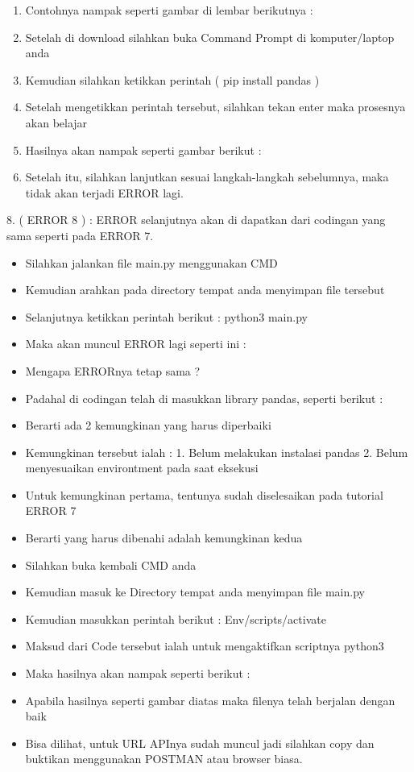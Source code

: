 \begin{itemize}
\begin{enumerate}
\item Contohnya nampak seperti gambar di lembar berikutnya : 
\item Setelah di download silahkan buka Command Prompt di komputer/laptop anda 
\item Kemudian silahkan ketikkan perintah ( pip install pandas ) 
\item Setelah mengetikkan perintah tersebut, silahkan tekan enter maka prosesnya akan belajar 
\item Hasilnya akan nampak seperti gambar berikut : 
\item Setelah itu, silahkan lanjutkan sesuai langkah-langkah sebelumnya, maka tidak akan terjadi ERROR lagi. 
\end{enumerate}
\end{itemize}

8. ( ERROR 8 ) : 
ERROR selanjutnya akan di dapatkan dari codingan yang sama seperti pada ERROR 7. 
\begin{itemize}
\item Silahkan jalankan file main.py menggunakan CMD 
\item Kemudian arahkan pada directory tempat anda menyimpan file tersebut 
\item Selanjutnya ketikkan perintah berikut : python3 main.py 
\item Maka akan muncul ERROR lagi seperti ini : 
\item Mengapa ERRORnya tetap sama ? 
\item Padahal di codingan telah di masukkan library pandas, seperti berikut : 
\item Berarti ada 2 kemungkinan yang harus diperbaiki 
\item Kemungkinan tersebut ialah : 
1. Belum melakukan instalasi pandas 
2. Belum menyesuaikan environtment pada saat eksekusi 
\item Untuk kemungkinan pertama, tentunya sudah diselesaikan pada tutorial ERROR 7 
\item Berarti yang harus dibenahi adalah kemungkinan kedua 
\item Silahkan buka kembali CMD anda 
\item Kemudian masuk ke Directory tempat anda menyimpan file main.py 
\item Kemudian masukkan perintah berikut : Env/scripts/activate 
\item Maksud dari Code tersebut ialah untuk mengaktifkan scriptnya python3 
\item Maka hasilnya akan nampak seperti berikut : 
\item Apabila hasilnya seperti gambar diatas maka filenya telah berjalan dengan baik 
\item Bisa dilihat, untuk URL APInya sudah muncul jadi silahkan copy dan buktikan menggunakan POSTMAN atau browser biasa. 
\end{itemize}
 
